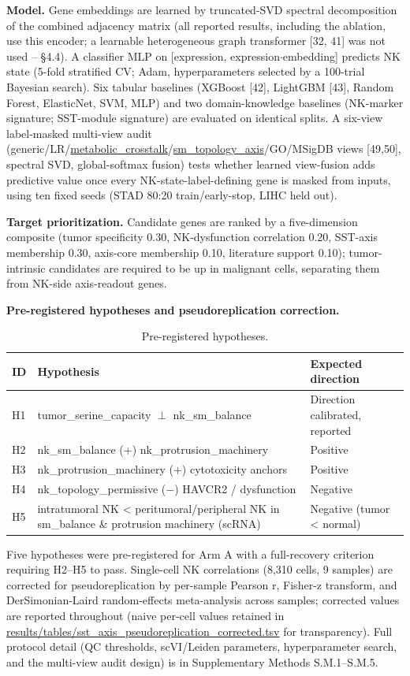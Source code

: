 \documentclass[modern,large,numbered,nocrop]{oup-authoring-template}
\begin{document}
\textbf{Model.} Gene embeddings are learned by truncated-SVD spectral decomposition of the combined adjacency matrix (all reported results, including the ablation, use this encoder; a learnable heterogeneous graph transformer [32, 41] was not used -- \S{}4.4). A classifier MLP on [expression, expression$\cdot$embedding] predicts NK state (5-fold stratified CV; Adam, hyperparameters selected by a 100-trial Bayesian search). Six tabular baselines (XGBoost [42], LightGBM [43], Random Forest, ElasticNet, SVM, MLP) and two domain-knowledge baselines (NK-marker signature; SST-module signature) are evaluated on identical splits. A six-view label-masked multi-view audit (generic/LR/\url{metabolic_crosstalk}/\url{sm_topology_axis}/GO/MSigDB views [49,50], spectral SVD, global-softmax fusion) tests whether learned view-fusion adds predictive value once every NK-state-label-defining gene is masked from inputs, using ten fixed seeds (STAD 80:20 train/early-stop, LIHC held out).

\textbf{Target prioritization.} Candidate genes are ranked by a five-dimension composite (tumor specificity 0.30, NK-dysfunction correlation 0.20, SST-axis membership 0.30, axis-core membership 0.10, literature support 0.10); tumor-intrinsic candidates are required to be up in malignant cells, separating them from NK-side axis-readout genes.

\textbf{Pre-registered hypotheses and pseudoreplication correction.}

\begin{table}[htbp]
\caption{Pre-registered hypotheses.}
\small
\begin{tabularx}{\textwidth}{@{}lXX@{}}
\toprule
ID & Hypothesis & Expected direction \\
\midrule
H1 & tumor\_serine\_capacity $\perp$ nk\_sm\_balance & Direction calibrated, reported \\
H2 & nk\_sm\_balance (+) nk\_protrusion\_machinery & Positive \\
H3 & nk\_protrusion\_machinery (+) cytotoxicity anchors & Positive \\
H4 & nk\_topology\_permissive ($-$) HAVCR2 / dysfunction & Negative \\
H5 & intratumoral NK < peritumoral/peripheral NK in sm\_balance \& protrusion machinery (scRNA) & Negative (tumor < normal) \\
\bottomrule
\end{tabularx}
\end{table}

Five hypotheses were pre-registered for Arm A with a full-recovery criterion requiring H2--H5 to pass. Single-cell NK correlations (8,310 cells, 9 samples) are corrected for pseudoreplication by per-sample Pearson r, Fisher-z transform, and DerSimonian-Laird random-effects meta-analysis across samples; corrected values are reported throughout (naive per-cell values retained in \url{results/tables/sst_axis_pseudoreplication_corrected.tsv} for transparency). Full protocol detail (QC thresholds, scVI/Leiden parameters, hyperparameter search, and the multi-view audit design) is in Supplementary Methods S.M.1--S.M.5.
\end{document}
